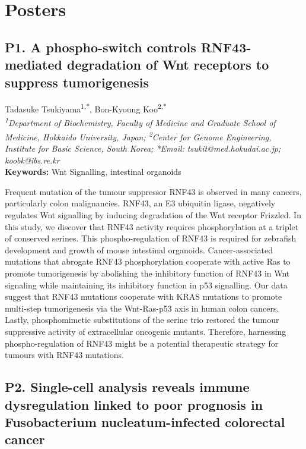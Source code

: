 \chapter{Posters}

\section*{P1. A phospho-switch controls RNF43-mediated degradation of Wnt receptors to suppress tumorigenesis}

\begin{center}
Tadasuke Tsukiyama\textsuperscript{1,*}, Bon-Kyoung Koo\textsuperscript{2,*} \\
\vspace{0.2cm}
\textit{\textsuperscript{1}Department of Biochemistry, Faculty of Medicine and Graduate School of Medicine, Hokkaido University, Japan; \textsuperscript{2}Center for Genome Engineering, Institute for Basic Science, South Korea; *Email: tsukit@med.hokudai.ac.jp; koobk@ibs.re.kr} \\
\vspace{0.2cm}
\textbf{Keywords:} Wnt Signalling, intestinal organoids
\end{center}

\noindent
Frequent mutation of the tumour suppressor RNF43 is observed in many cancers, particularly colon malignancies. RNF43, an E3 ubiquitin ligase, negatively regulates Wnt signalling by inducing degradation of the Wnt receptor Frizzled. In this study, we discover that RNF43 activity requires phosphorylation at a triplet of conserved serines. This phospho-regulation of RNF43 is required for zebrafish development and growth of mouse intestinal organoids. Cancer-associated mutations that abrogate RNF43 phosphorylation cooperate with active Ras to promote tumorigenesis by abolishing the inhibitory function of RNF43 in Wnt signaling while maintaining its inhibitory function in p53 signalling. Our data suggest that RNF43 mutations cooperate with KRAS mutations to promote multi-step tumorigenesis via the Wnt-Ras-p53 axis in human colon cancers. Lastly, phosphomimetic substitutions of the serine trio restored the tumour suppressive activity of extracellular oncogenic mutants. Therefore, harnessing phospho-regulation of RNF43 might be a potential therapeutic strategy for tumours with RNF43 mutations.
\newpage

\section*{P2. Single-cell analysis reveals immune dysregulation linked to poor prognosis in Fusobacterium nucleatum-infected colorectal cancer}

